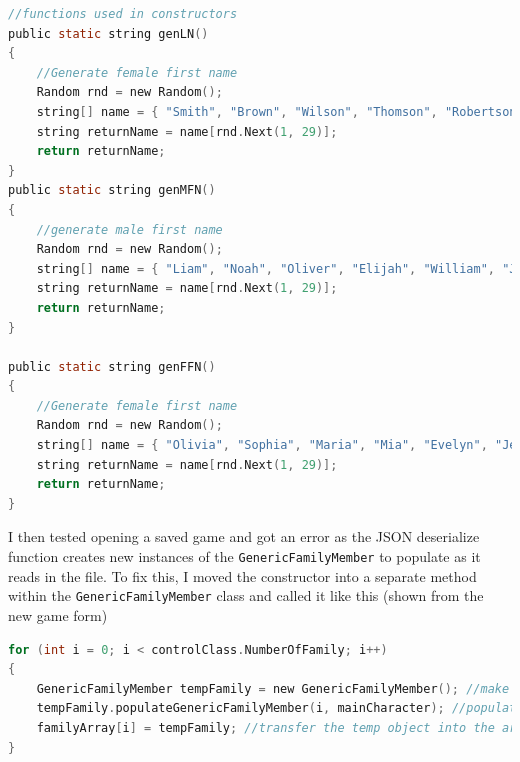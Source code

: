 \begin{lstlisting}[language=c, style=csharp, caption=Random name generation functions]
 //functions used in constructors
public static string genLN()
{
    //Generate female first name
    Random rnd = new Random();
    string[] name = { "Smith", "Brown", "Wilson", "Thomson", "Robertson", "Campbell", "Stewart", "Macdonald", "Murray", "Reid", "Taylor", "Clark", "Mitchell", "Ross", "Watson", "Miller", "Gray", "Simpson", "Duncan", "Bell", "Grant", "Mackenzie", "Allan", "Wood", "Muir", "Watt", "King", "Bruce", "Boyle", "Douglas" };
    string returnName = name[rnd.Next(1, 29)];
    return returnName;
}
public static string genMFN()
{
    //generate male first name
    Random rnd = new Random();
    string[] name = { "Liam", "Noah", "Oliver", "Elijah", "William", "James", "Benjamin", "Ben", "Lucas", "Henry", "Alex", "Ethan", "Daniel", "Sebstian", "Jack", "Matt", "John", "Joe", "David", "Josh", "Julien", "Leo", "Isaac", "Thomas", "Max", "Andy", "Phill", "Harvey", "Ryan" };
    string returnName = name[rnd.Next(1, 29)];
    return returnName;
}

public static string genFFN()
{
    //Generate female first name
    Random rnd = new Random();
    string[] name = { "Olivia", "Sophia", "Maria", "Mia", "Evelyn", "Jess", "Ella", "Zoe", "Jemma", "Gemma", "Emily", "Nuala", "Maggie", "Ciara", "Scarlett", "Layla", "Chloe", "Ellie", "Hazel", "Lucy", "Niamh", "Kat", "Victoria", "Lily", "Hannah", "Chloe", "Lara", "Bella", "Ruby" };
    string returnName = name[rnd.Next(1, 29)];
    return returnName;
}
\end{lstlisting}
I then tested opening a saved game and got an error as the JSON deserialize function creates new instances of the \verb|GenericFamilyMember| to populate as it reads in the file. To fix this, I moved the constructor into a separate method within the \verb|GenericFamilyMember| class and called it like this (shown from the new game form)
\begin{lstlisting}[language=c, style=csharp, caption=Code used to generate generic family members]
for (int i = 0; i < controlClass.NumberOfFamily; i++)
{
    GenericFamilyMember tempFamily = new GenericFamilyMember(); //make new instance of the object
    tempFamily.populateGenericFamilyMember(i, mainCharacter); //populate that object using the 'constructor' in the GenericFamilyMemberclass
    familyArray[i] = tempFamily; //transfer the temp object into the array.
}
\end{lstlisting}

